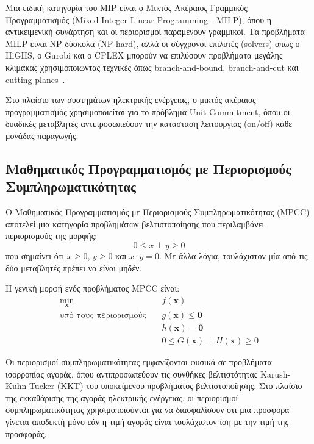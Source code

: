 Μια ειδική κατηγορία του MIP είναι ο Μικτός Ακέραιος Γραμμικός Προγραμματισμός (Mixed-Integer Linear Programming - MILP), όπου η αντικειμενική συνάρτηση και οι περιορισμοί παραμένουν γραμμικοί. Τα προβλήματα MILP είναι NP-δύσκολα (NP-hard), αλλά οι σύγχρονοι επιλυτές (solvers) όπως ο HiGHS, ο Gurobi και ο CPLEX μπορούν να επιλύσουν προβλήματα μεγάλης κλίμακας χρησιμοποιώντας τεχνικές όπως branch-and-bound, branch-and-cut και cutting planes~\cite{wolsey1998}.

Στο πλαίσιο των συστημάτων ηλεκτρικής ενέργειας, ο μικτός ακέραιος προγραμματισμός χρησιμοποιείται για το πρόβλημα Unit Commitment, όπου οι δυαδικές μεταβλητές αντιπροσωπεύουν την κατάσταση λειτουργίας (on/off) κάθε μονάδας παραγωγής.

\subsection{Μαθηματικός Προγραμματισμός με Περιορισμούς Συμπληρωματικότητας}
\label{subsec:mpcc}

Ο Μαθηματικός Προγραμματισμός με Περιορισμούς Συμπληρωματικότητας (MPCC) αποτελεί μια κατηγορία προβλημάτων βελτιστοποίησης που περιλαμβάνει περιορισμούς της μορφής:
\begin{equation}
\label{eq:complementarity}
0 \leq x \perp y \geq 0
\end{equation}
που σημαίνει ότι $x \geq 0$, $y \geq 0$ και $x \cdot y = 0$. Με άλλα λόγια, τουλάχιστον μία από τις δύο μεταβλητές πρέπει να είναι μηδέν.

Η γενική μορφή ενός προβλήματος MPCC είναι:
\begin{equation}
\label{eq:mpcc-general}
\begin{aligned}
\min_{\mathbf{x}} \quad & f(\mathbf{x}) \\
\text{υπό τους περιορισμούς} \quad & g(\mathbf{x}) \leq \mathbf{0} \\
& h(\mathbf{x}) = \mathbf{0} \\
& 0 \leq G(\mathbf{x}) \perp H(\mathbf{x}) \geq 0
\end{aligned}
\end{equation}

Οι περιορισμοί συμπληρωματικότητας εμφανίζονται φυσικά σε προβλήματα ισορροπίας αγοράς, όπου αντιπροσωπεύουν τις συνθήκες βελτιστότητας Karush-Kuhn-Tucker (KKT) του υποκείμενου προβλήματος βελτιστοποίησης. Στο πλαίσιο της εκκαθάρισης της αγοράς ηλεκτρικής ενέργειας, οι περιορισμοί συμπληρωματικότητας χρησιμοποιούνται για να διασφαλίσουν ότι μια προσφορά γίνεται αποδεκτή μόνο εάν η τιμή αγοράς είναι τουλάχιστον ίση με την τιμή της προσφοράς.

